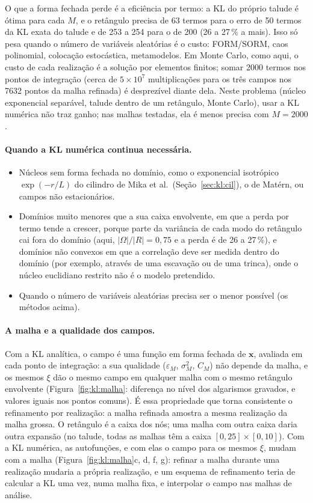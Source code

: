 O que a forma fechada perde é a eficiência por termo: a KL do próprio talude é ótima para cada $M$, e o retângulo precisa
de 63 termos para o erro de 50 termos da KL exata do talude e de 253 a 254 para o de 200 (26 a 27\,\% a mais). Isso
só pesa quando o número de variáveis aleatórias é o custo: FORM/SORM, caos polinomial, colocação estocástica,
metamodelos. Em Monte Carlo, como aqui, o custo de cada realização é a solução por elementos finitos; somar 2000
termos nos pontos de integração (cerca de $5 \times 10^7$ multiplicações para os três campos nos 7632 pontos da malha
refinada) é desprezível diante dela. Neste problema (núcleo exponencial separável, talude dentro de um
retângulo, Monte Carlo), usar a KL numérica não traz ganho; nas malhas testadas, ela é menos precisa com $M = 2000$.

\paragraph{Quando a KL numérica continua necessária.}
\begin{itemize}
  \item Núcleos sem forma fechada no domínio, como o exponencial isotrópico $\exp(-r/L)$ do cilindro de Mika et al.\
    (Seção~\ref{sec:kl:cil}), o de Matérn, ou campos não estacionários.
  \item Domínios muito menores que a sua caixa envolvente, em que a perda por termo tende a crescer, porque parte da
    variância de cada modo do retângulo cai fora do domínio (aqui, $|\Omega|/|R| = 0{,}75$ e a perda é de 26 a 27\,\%),
    e domínios não convexos em que a correlação deve ser medida dentro do domínio (por exemplo, através de uma escavação
    ou de uma trinca), onde o núcleo euclidiano restrito não é o modelo pretendido.
  \item Quando o número de variáveis aleatórias precisa ser o menor possível (os métodos acima).
\end{itemize}

\paragraph{A malha e a qualidade dos campos.}
Com a KL analítica, o campo é uma função em forma fechada de $\mathbf{x}$, avaliada em cada ponto de integração: a sua
qualidade ($\varepsilon_M$, $\sigma_M^2$, $C_M$) não depende da malha, e os mesmos $\xi$ dão o mesmo campo em qualquer
malha com o mesmo retângulo envolvente (Figura~\ref{fig:kl:malha}: diferença no nível dos algarismos gravados, e valores
iguais nos pontos comuns). É essa propriedade que torna consistente o refinamento por realização: a malha refinada
amostra a mesma realização da malha grossa. O retângulo é a caixa dos nós; uma malha com outra caixa daria outra
expansão (no talude, todas as malhas têm a caixa $[0, 25] \times [0, 10]$). Com a KL numérica, as autofunções, e com
elas o campo para os mesmos $\xi$, mudam com a malha (Figura~\ref{fig:kl:malha}c, d, f, g): refinar a malha durante
uma realização mudaria a própria realização, e um esquema de refinamento teria de calcular a KL uma vez, numa malha
fixa, e interpolar o campo nas malhas de análise.

